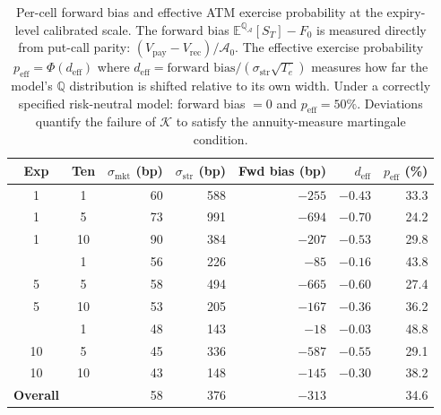 \begin{table}[H]
\centering
\caption{Per-cell forward bias and effective ATM exercise probability at the expiry-level calibrated scale. The forward bias $\mathbb{E}^{\mathbb{Q}_\mathcal{A}}[S_T] - F_0$ is measured directly from put-call parity: $(V_{\mathrm{pay}} - V_{\mathrm{rec}})/\mathcal{A}_0$. The effective exercise probability $p_{\mathrm{eff}} = \Phi(d_{\mathrm{eff}})$ where $d_{\mathrm{eff}} = \text{forward bias} / (\sigma_{\mathrm{str}}\sqrt{T_e})$ measures how far the model's $\mathbb{Q}$ distribution is shifted relative to its own width. Under a correctly specified risk-neutral model: forward bias $= 0$ and $p_{\mathrm{eff}} = 50\%$. Deviations quantify the failure of $\mathcal{K}$ to satisfy the annuity-measure martingale condition.}
\label{tab:delta_diagnostic}
\begin{tabular}{@{}ccrrrrr@{}}
\toprule
\textbf{Exp} & \textbf{Ten} & $\sigma_{\mathrm{mkt}}$ \textbf{(bp)} & $\sigma_{\mathrm{str}}$ \textbf{(bp)} & \textbf{Fwd bias (bp)} & $d_{\mathrm{eff}}$ & $p_{\mathrm{eff}}$ \textbf{(\%)} \\
\midrule
1 & 1 & 60 & 588 & $-255$ & $-0.43$ & 33.3 \\
1 & 5 & 73 & 991 & $-694$ & $-0.70$ & 24.2 \\
1 & 10 & 90 & 384 & $-207$ & $-0.53$ & 29.8 \\
\addlinespace[2pt]
5 & 1 & 56 & 226 & $-85$ & $-0.16$ & 43.8 \\
5 & 5 & 58 & 494 & $-665$ & $-0.60$ & 27.4 \\
5 & 10 & 53 & 205 & $-167$ & $-0.36$ & 36.2 \\
\addlinespace[2pt]
10 & 1 & 48 & 143 & $-18$ & $-0.03$ & 48.8 \\
10 & 5 & 45 & 336 & $-587$ & $-0.55$ & 29.1 \\
10 & 10 & 43 & 148 & $-145$ & $-0.30$ & 38.2 \\
\midrule
\textbf{Overall} & & 58 & 376 & $-313$ & & 34.6 \\
\bottomrule
\end{tabular}
\end{table}